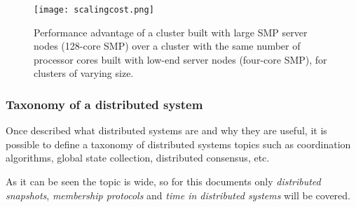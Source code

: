 \begin{figure}[!h]
\begin{center}
\texttt{[image: scalingcost.png]}
\caption{Performance advantage of a cluster built with large SMP server nodes
  (128-core SMP) over a cluster with the same number of processor cores built
  with low-end server nodes (four-core SMP), for clusters of varying
  size.\cite{Datacenter}}
\label{fig:highend}
\end{center}
\end{figure}

\subsubsection{Taxonomy of a distributed system}

Once described what distributed systems are and why they are useful, it is
possible to define a taxonomy of distributed systems topics such as coordination
algorithms, global state collection, distributed consensus, etc.

As it can be seen the topic is wide, so for this documents only
\textit{distributed snapshots}, \textit{membership protocols} and \textit{time
  in distributed systems} will be covered.

